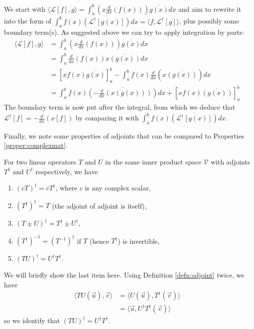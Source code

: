\begin{solution}
We start with $\langle \mathcal{L}[f], g \rangle = \int_a^b \left(x\frac{d}{dx}(f(x))\right) \overline{g(x)} dx$ and aim to rewrite it into the form of $\int_a^b f(x) \overline{(\mathcal{L^\dag}[g(x)])} dx = \langle f, \mathcal{L}^\dag[g] \rangle$, plus possibly some boundary term(s). As suggested above we can try to apply integration by parts:
\begin{align*}
\langle \mathcal{L}[f], g \rangle &=  \int_a^b \left(x\frac{d}{dx}(f(x))\right) \overline{g(x)} dx \\  
&= \int_a^b \frac{d}{dx}(f(x)) x\overline{(g(x))} dx \\
&= [xf(x)\overline{g(x)}]_a^b - \int_a^b f(x)\frac{d}{dx}(x\overline{(g(x))}) dx \\
&= \int_a^b f(x)\overline{\left(-\frac{d}{dx}(x(g(x)))\right)} dx + [xf(x)\overline{(g(x))}]_a^b
\end{align*}
The boundary term is now put after the integral, from which we deduce that $\mathcal{L}^\dag[f] = -\frac{d}{dx}(x[f])$ by comparing it with $\int_a^b f(x) \overline{(\mathcal{L^\dag}[g(x)])} dx$.
\end{solution}
Finally, we note some properties of adjoints that can be compared to Properties \ref{proper:complexmat}.
\begin{proper}
\label{proper:adjoints}
For two linear operators $T$ and $U$ in the same inner product space $\mathcal{V}$ with adjoints $T^\dag$ and $U^\dag$ respectively, we have
\begin{enumerate}
\item $(cT)^\dag = \overline{c}T^\dag$, where $c$ is any complex scalar,
\item $(T^\dag)^\dag = T$ (the adjoint of adjoint is itself),
\item $(T \pm U)^\dag = T^\dag \pm U^\dag$,
\item $(T^\dag)^{-1} = (T^{-1})^\dag$ if $T$ (hence $T^\dag$) is invertible,
\item $(TU)^\dag = U^\dag T^\dag$.
\end{enumerate}
\end{proper}
We will briefly show the last item here. Using Definition \ref{defn:adjoint} twice, we have
\begin{align*}
\langle TU(\vec{u}), \vec{v} \rangle &= \langle U(\vec{u}), T^\dag(\vec{v}) \rangle \\
&= \langle \vec{u}, U^\dag T^\dag(\vec{v}) \rangle
\end{align*}
so we identify that $(TU)^\dag = U^\dag T^\dag$.

